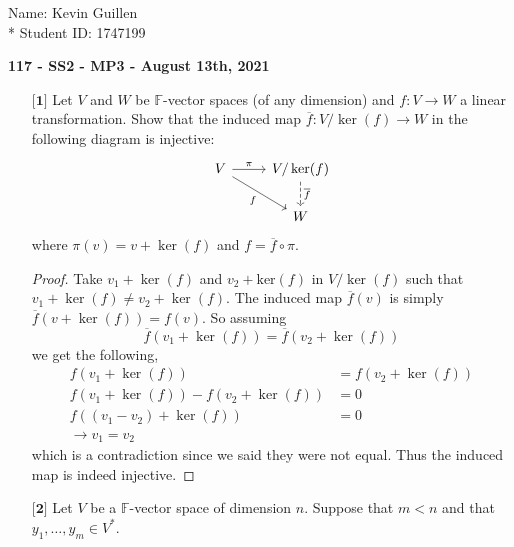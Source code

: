 \documentclass[12pt]{article}
\begin{document}
\begin{flushright}
    Name: Kevin Guillen \\*
    Student ID: 1747199
\end{flushright}
\begin{center}
    {\bf 117 - SS2 - MP3 - August 13th, 2021}
\end{center}

\begin{itemize}

    \item[$\textbf{[1]}$] 
    Let $V$ and $W$ be $\mathbb{F}$-vector spaces (of any dimension) and $f: V \rightarrow W$ a linear transformation. Show that the induced map $\overline{f}: V/\ker(f) \rightarrow W$ in the following diagram is injective:
    \[ \begin{tikzcd}
    V \arrow{r}{\pi} \arrow{rd}[swap]{f} & V/\ker(f) \arrow[dashed]{d}{\overline{f}} \\
    & W
    \end{tikzcd} \]
    where $\pi(v) = v + \ker(f)$ and $f = \overline{f} \circ \pi$. 
    
    \begin{proof}
        Take $v_1 + \ker(f)$ and $v_2 + \text{ker}(f)$ in $V/\ker(f)$ such that $v_1 + \ker(f) \neq v_2 + \ker(f)$. The induced map $\overline{f}(v)$ is simply $\overline{f}(v+ \ker(f)) = f(v)$. So assuming \[\overline{f}(v_1 + \ker(f)) = \overline{f}(v_2 + \ker(f))\]
        we get the following,
        \begin{align*}
            f(v_1 + \ker(f)) &= f(v_2 +\ker(f)) \\
            f(v_1 + \ker(f)) - f(v_2 +\ker(f)) &= 0 \\
            f((v_1 -v_2) + \ker(f) ) &=0\\
            \rightarrow v_1 = v_2
        \end{align*} 
        which is a contradiction since we said they were not equal. Thus the induced map is indeed injective.  
    \end{proof}

    \vspace{.5cm}
    \item[$\textbf{[2]}$]
    Let $V$ be a $\mathbb{F}$-vector space of dimension $n$. Suppose that $m < n$ and that $y_1,\dots,y_m \in V^*$.
    \begin{itemize}
    

\end{itemize}
\end{itemize}
\end{document}
